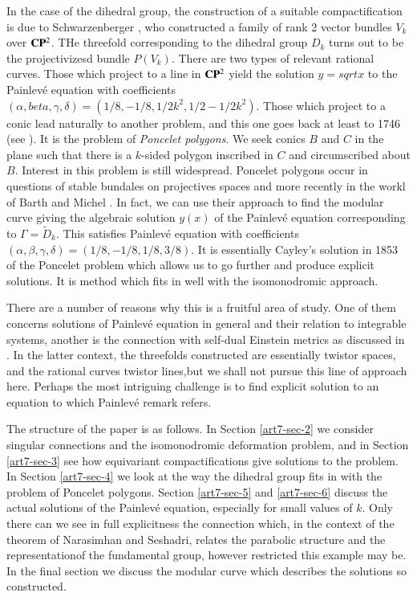 In the case of the dihedral group, the construction of a suitable compactification is due to Schwarzenberger \cite{art7-key16}, who constructed a family of rank 2 vector bundles $V_{k}$ over $\mathbf{C}\mathbf{P}^{2}$. THe threefold corresponding to the dihedral group $D_{k}$ turns out to be the projectivizesd bundle $P(V_{k})$. There are two types of relevant rational curves. Those which project to a line in $\mathbf{C}\mathbf{P}^{2}$ yield the solution $y =sqrt{x}$ to the Painlev\'e equation with coefficients $(\alpha, beta, \gamma, \delta) = (1/8, -1/8, 1/2k^{2}, 1/2-1/2k^{2})$. Those which project to a conic lead naturally to another problem, and this one goes back at least to 1746 (see \cite{art7-key3}). It is the problem of \textit{Poncelet polygons}. We seek conics $B$ and $C$ in the plane such that there is a $k$-sided polygon inscribed in  $C$ and circumscribed about $B$. Interest in this problem is still widespread. Poncelet polygons occur in questions of stable bundales on projectives spaces\cite{art7-key14} and more recently in the workl of Barth and Michel \cite{art7-key1}. In fact, we can use their approach to find the modular curve giving the algebraic solution $y(x)$ of the Painlev\'e equation corresponding to $\Gamma = \tilde{D}_{k}$. This satisfies Painlev\'e equation with coefficients $(\alpha, \beta, \gamma, \delta) = (1/8, -1/8, 1/8, 3/8)$. It is essentially Cayley's solution in 1853 of the Poncelet problem which allows us to go further and produce explicit solutions. It is method which fits in well with the isomonodromic approach. 

There are a number of reasons why this is a fruitful area of study. One of them concerns solutions of Painlev\'e equation in general and their relation to integrable systems, another is the connection with self-dual Einstein metrics as discussed in \cite{art7-key6}. In the latter context, the threefolds constructed are essentially twistor spaces, and the rational curves twistor lines,but we shall not pursue this line of approach here. Perhaps the most intriguing challenge is to find  explicit solution to an equation to which Painlev\'e remark refers.

The structure of the paper is as follows. In Section \ref{art7-sec-2} we consider singular connections and the isomonodromic deformation problem, and in Section \ref{art7-sec-3} see how equivariant compactifications give solutions to the problem. In Section \ref{art7-sec-4} we look at the way the dihedral group fits in with the problem of Poncelet polygons. Section \ref{art7-sec-5} and \ref{art7-sec-6} discuss the actual solutions of the Painlev\'e equation, especially for small values of $k$. Only there can we see in full explicitness the connection which, in the context of the theorem of Narasimhan and Seshadri, relates the parabolic structure and the representation\pageoriginale of the fundamental group, however restricted this example may be. In the final section we discuss the modular curve which describes the solutions so constructed.

